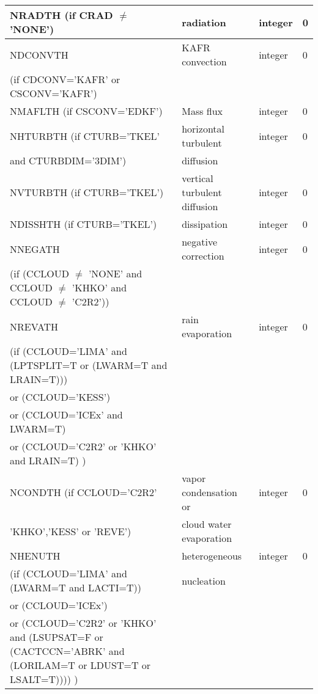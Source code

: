 \begin{longtable} {|p{}|p{}|>{\centering}p{}|p{}<{\centering}|}
NRADTH (if CRAD $\neq$ 'NONE')  & radiation           & integer  &  0 \index{NRADTH!\innam{NAM\_BU\_RTH}}\\\hline
NDCONVTH & KAFR convection          & integer  &  0 \index{NDCONVTH!\innam{NAM\_BU\_RTH}}\\ \nopagebreak
(if CDCONV='KAFR' or CSCONV='KAFR') &  &   &   \\\hline
NMAFLTH (if CSCONV='EDKF') & Mass flux & integer  &  0 \index{NMAFLTH!\innam{NAM\_BU\_RTH}} \\\hline
NHTURBTH (if CTURB='TKEL'& horizontal turbulent & integer  &  0 \index{NHTURBTH!\innam{NAM\_BU\_RTH}}\\ \nopagebreak
and CTURBDIM='3DIM') & diffusion&   &  \\\hline
NVTURBTH (if CTURB='TKEL') & vertical turbulent diffusion & integer  &  0 \index{NVTURBTH!\innam{NAM\_BU\_RTH}}\\\hline
NDISSHTH (if CTURB='TKEL') & dissipation         & integer  &  0 \index{NDISSHTH!\innam{NAM\_BU\_RTH}}\\\hline
NNEGATH  & negative correction & integer  &  0 \index{NNEGATH!\innam{NAM\_BU\_RTH}}\\\hline
(if (CCLOUD $\neq$ 'NONE' and CCLOUD $\neq$ 'KHKO' and CCLOUD $\neq$ 'C2R2')) & &   &  \\\hline
NREVATH & rain evaporation    & integer  &  0 \index{NREVATH!\innam{NAM\_BU\_RTH}}\\\hline
(if (CCLOUD='LIMA' and (LPTSPLIT=T or (LWARM=T and LRAIN=T))) & & & \\ \nopagebreak
 or (CCLOUD='KESS') & & & \\ \nopagebreak
 or (CCLOUD='ICEx' and LWARM=T) & & & \\ \nopagebreak
 or (CCLOUD='C2R2' or 'KHKO' and LRAIN=T) ) & & & \\ \hline
NCONDTH (if CCLOUD='C2R2'  & vapor condensation  or     & integer  &  0 \index{NCONDTH!\innam{NAM\_BU\_RTH}}\\ \nopagebreak
'KHKO','KESS' or 'REVE')& cloud water  evaporation  &          &    \\\hline
NHENUTH   & heterogeneous  & integer  &  0 \index{NHENUTH!\innam{NAM\_BU\_RTH}}\\ \nopagebreak
(if (CCLOUD='LIMA' and (LWARM=T and LACTI=T)) & nucleation & & \\ \nopagebreak
 or (CCLOUD='ICEx') & & & \\ \nopagebreak
 or (CCLOUD='C2R2' or 'KHKO' and (LSUPSAT=F or (CACTCCN='ABRK' and (LORILAM=T or LDUST=T or LSALT=T)))) ) & & & \\ \hline

\end{longtable}
